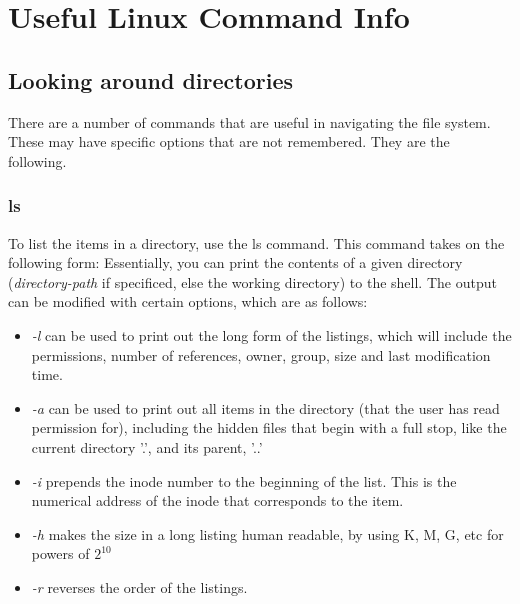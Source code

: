 \documentclass{article}
\begin{document}
\tableofcontents
\newpage


\section{Useful Linux Command Info}
\subsection{Looking around directories}

There are a number of commands that are useful in navigating the file system. These may have specific options that are not remembered. They are the following.

\subsubsection{ls}
To list the items in a directory, use the ls command. This command takes on the following form:
Essentially, you can print the contents of a given directory (\textit{directory-path} if specificed, else the working directory) to the shell. The output can be modified with certain options, which are as follows:
\begin{itemize}
    \item \textit{-l} can be used to print out the long form of the listings, which will include the permissions, number of references, owner, group, size and last modification time.
    \item \textit{-a} can be used to print out all items in the directory (that the user has read permission for), including the hidden files that begin with a full stop, like the current directory '.', and its parent, '..'
    \item \textit{-i} prepends the inode number to the beginning of the list. This is the numerical address of the inode that corresponds to the item.
    \item \textit{-h} makes the size in a long listing human readable, by using K, M, G, etc for powers of $2^{10}$
    \item \textit{-r} reverses the order of the listings.
\end{itemize}
\end{document}
